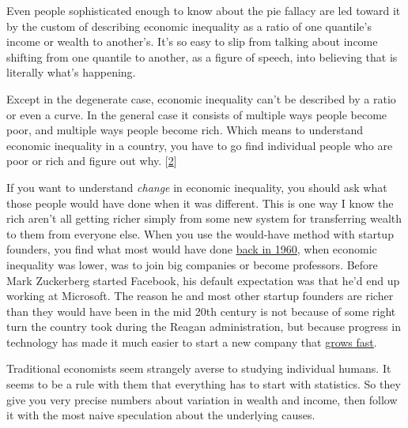Even
                  people sophisticated enough to know about the pie fallacy are
                  led toward it by the custom of describing economic inequality
                  as a ratio of one quantile's income or wealth to another's.
                  It's so easy to slip from talking about income shifting from
                  one quantile to another, as a figure of speech, into believing
                  that is literally what's happening.

Except in the
                  degenerate case, economic inequality can't be described by a
                  ratio or even a curve. In the general case it consists of
                  multiple ways people become poor, and multiple ways people
                  become rich. Which means to understand economic inequality in
                  a country, you have to go find individual people who are poor
                  or rich and figure out why.
                  [\href{\#f2n}{2}]

If you want to understand \emph{change} in
                  economic inequality, you should ask what those people would
                  have done when it was different. This is one way I know the
                  rich aren't all getting richer simply from some new system for
                  transferring wealth to them from everyone else. When you use
                  the would-have method with startup founders, you find what
                  most would have done \href{http://www.paulgraham.com/re.html}{\underline{back in 1960}}, when economic inequality was lower, was to join big
                  companies or become professors. Before Mark Zuckerberg started
                  Facebook, his default expectation was that he'd end up working
                  at Microsoft. The reason he and most other startup founders
                  are richer than they would have been in the mid 20th century
                  is not because of some right turn the country took during the
                  Reagan administration, but because progress in technology has
                  made it much easier to start a new company that
                  \href{http://www.paulgraham.com/growth.html}{\underline{grows fast}}.

Traditional economists seem strangely averse to
                  studying individual humans. It seems to be a rule with them
                  that everything has to start with statistics. So they give you
                  very precise numbers about variation in wealth and income,
                  then follow it with the most naive speculation about the
                  underlying causes.

